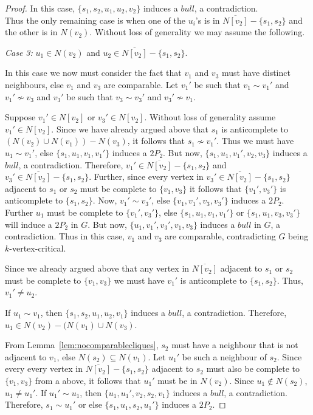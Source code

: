 \documentclass[11pt]{article}
\theoremstyle{definition}
\begin{document}
\begin{proof}
In this case, $\{s_1,s_2,u_1,u_2,v_2\}$ induces a $bull$, a contradiction.\\

Thus the only remaining case is when one of the $u_i$'s is in $\overline{N[v_2]}-\{s_1,s_2\}$ and the other is in $N(v_2)$. Without loss of generality we may assume the following.

\noindent \textit{Case 3:} $u_1\in N(v_2)$ and $u_2\in\overline{N[v_2]}-\{s_1,s_2\}$.

In this case we now must consider the fact that $v_1$ and $v_3$ must have distinct neighbours, else $v_1$ and $v_3$ are comparable. Let $v_1'$ be such that $v_1\sim v_1'$ and $v_1'\nsim v_3$ and $v_3'$ be such that $v_3\sim v_3'$ and $v_3'\nsim v_1$. 

Suppose $v_1'\in N[v_2]$ or $v_3'\in N[v_2]$. Without loss of generality assume $v_1'\in N[v_2]$. Since we have already argued above that $s_1$ is anticomplete to $(N(v_2)\cup N(v_1))-N(v_3)$, it follows that $s_1\nsim v_1'$. Thus we must have $u_1\sim v_1'$, else $\{s_1,u_1,v_1,v_1'\}$ induces a $2P_2$. But now, $\{s_1,u_1,v_1',v_2,v_3\}$ induces a $bull$, a contradiction. Therefore,  $v_1'\in \overline{N[v_2]}-\{s_1,s_2\}$ and $v_3'\in \overline{N[v_2]}-\{s_1,s_2\}$. Further, since every vertex in $v_3'\in \overline{N[v_2]}-\{s_1,s_2\}$ adjacent to $s_1$ or $s_2$ must be complete to $\{v_1,v_3\}$ it follows that $\{v_1',v_3'\}$ is anticomplete to $\{s_1,s_2\}$. Now, $v_1'\sim v_3'$, else $\{v_1,v_1',v_3,v_3'\}$ induces a $2P_2$. Further $u_1$ must be complete to $\{v_1',v_3'\}$, else $\{s_1,u_1,v_1,v_1'\}$ or $\{s_1,u_1,v_3,v_3'\}$ will induce a $2P_2$ in $G$. But now, $\{u_1,v_1',v_3',v_1,v_3\}$ induces a $bull$ in $G$, a contradiction. Thus in this case, $v_1$ and $v_3$ are comparable, contradicting $G$ being $k$-vertex-critical.



 
Since we already argued above that any vertex in $\overline{N[v_2]}$ adjacent to $s_1$ or $s_2$ must be complete to $\{v_1,v_3\}$ we must have $v_1'$ is anticomplete to $\{s_1,s_2\}$. Thus, $v_1'\neq u_2$.


If $u_1\sim v_1$, then $\{s_1,s_2,u_1,u_2,v_1\}$ induces a $bull$, a contradiction. Therefore, $u_1\in N(v_2)-(N(v_1)\cup N(v_3)$. 

From Lemma~\ref{lem:nocomparablecliques}, $s_2$ must have a neighbour that is not adjacent to $v_1$, else $N(s_2)\subseteq N(v_1)$. Let $u_1'$ be such a neighbour of $s_2$. Since every every vertex in $\overline{N[v_2]}-\{s_1,s_2\}$ adjacent to $s_2$ must also be complete to $\{v_1,v_3\}$ from a above, it follows that $u_1'$ must be in $N(v_2)$. Since $u_1\not\in N(s_2)$, $u_1\neq u_1'$. If $u_1'\sim u_1$, then $\{u_1,u_1',v_2,s_2,v_1\}$ induces a $bull$, a contradiction. Therefore, $s_1\sim u_1'$ or else $\{s_1,u_1,s_2,u_1'\}$ induces a $2P_2$. 


\end{proof}
\end{document}

